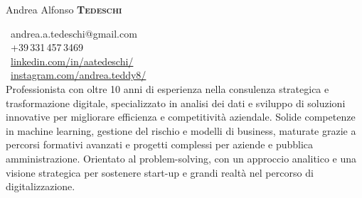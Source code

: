 \begin{minipage}[t]{0.33\textwidth} %
\colorbox{cvblue}{\begin{minipage}[t][5mm][t]{\textwidth}\null\hfill\null\end{minipage}}

\vspace{-.2ex} 						%
\colorbox{cvblue!90}{\color{white}  %
	\textwidth\relax		%
	\begin{minipage}[t][293mm][t]{0.82\textwidth}
	\raggedright
	\vspace*{2.5ex}

	\Large Andrea Alfonso \textbf{\textsc{Tedeschi}} \normalsize 

	\begin{center}
	\end{center}

	\vspace*{0.5ex} %

	\small %
	\MVAt\ {\small andrea.a.tedeschi@gmail.com} \\[0.4ex]
	\Telefon\ +39\,331\,457\,3469 \\[0.5ex]
	\faLinkedin\ \href{https://www.linkedin.com/in/aatedeschi/}{linkedin.com/in/aatedeschi/} \\[0.1ex]
	\faInstagram\ \href{https://www.instagram.com/andrea.teddy8/}{instagram.com/andrea.teddy8/} \\[0.1ex]

	Professionista con oltre 10 anni di esperienza nella consulenza strategica e trasformazione digitale, specializzato in analisi dei dati e sviluppo di soluzioni innovative per migliorare efficienza e competitività aziendale. Solide competenze in machine learning, gestione del rischio e modelli di business, maturate grazie a percorsi formativi avanzati e progetti complessi per aziende e pubblica amministrazione. Orientato al problem-solving, con un approccio analitico e una visione strategica per sostenere start-up e grandi realtà nel percorso di digitalizzazione.


\end{minipage}}
\end{minipage}
